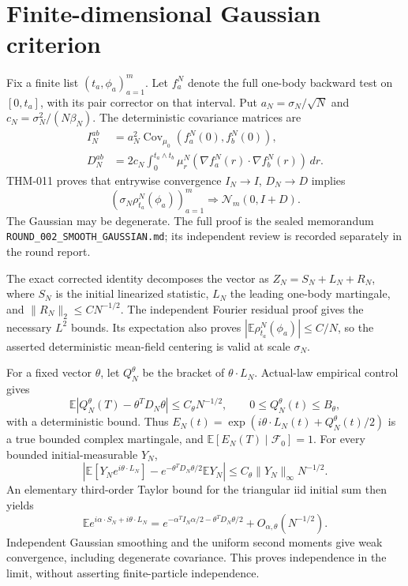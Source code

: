 \documentclass[11pt]{article}
\newcommand{\E}{\mathbb E}
\begin{document}
\section{Finite-dimensional Gaussian criterion}
Fix a finite list $(t_a,\phi_a)_{a=1}^m$. Let $f_a^N$ denote the full
one-body backward test on $[0,t_a]$, with its pair corrector on that interval.
Put $a_N=\sigma_N/\sqrt N$ and $c_N=\sigma_N^2/(N\beta_N)$. The deterministic
covariance matrices are
\begin{align*}
 I_N^{ab}&=a_N^2\operatorname{Cov}_{\mu_0}
                         (f_a^N(0),f_b^N(0)),\\
 D_N^{ab}&=2c_N\int_0^{t_a\wedge t_b}
        \mu_r^N(\nabla f_a^N(r)\cdot\nabla f_b^N(r))\,dr.
\end{align*}
THM-011 proves that entrywise convergence $I_N\to I$, $D_N\to D$ implies
\[
 (\sigma_N\rho_{t_a}^N(\phi_a))_{a=1}^m
       \Longrightarrow\mathcal N_m(0,I+D).
\]
The Gaussian may be degenerate. The full proof is the sealed memorandum
\nolinkurl{ROUND_002_SMOOTH_GAUSSIAN.md}; its independent review is recorded
separately in the round report.

The exact corrected identity decomposes the vector as $Z_N=S_N+L_N+R_N$,
where $S_N$ is the initial linearized statistic, $L_N$ the leading one-body
martingale, and $\|R_N\|_2\le C N^{-1/2}$. The independent Fourier residual
proof gives the necessary $L^2$ bounds. Its expectation also proves
$|\E\rho_{t_a}^N(\phi_a)|\le C/N$, so the asserted deterministic mean-field
centering is valid at scale $\sigma_N$.

For a fixed vector $\theta$, let $Q_N^\theta$ be the bracket of
$\theta\cdot L_N$. Actual-law empirical control gives
\[
 \E|Q_N^\theta(T)-\theta^TD_N\theta|\le C_\theta N^{-1/2},
 \qquad 0\le Q_N^\theta(t)\le B_\theta,
\]
with a deterministic bound. Thus
$E_N(t)=\exp(i\theta\cdot L_N(t)+Q_N^\theta(t)/2)$ is a true bounded complex
martingale, and $\E[E_N(T)\mid\mathcal F_0]=1$. For every bounded
initial-measurable $Y_N$,
\[
 \left|\E[Y_Ne^{i\theta\cdot L_N}]
       -e^{-\theta^TD_N\theta/2}\E Y_N\right|
 \le C_\theta\|Y_N\|_\infty N^{-1/2}.
\]
An elementary third-order Taylor bound for the triangular iid initial sum
then yields
\[
 \E e^{i\alpha\cdot S_N+i\theta\cdot L_N}
 =e^{-\alpha^TI_N\alpha/2-\theta^TD_N\theta/2}
        +O_{\alpha,\theta}(N^{-1/2}).
\]
Independent Gaussian smoothing and the uniform second moments give weak
convergence, including degenerate covariance. This proves independence in
the limit, without asserting finite-particle independence.
\end{document}
